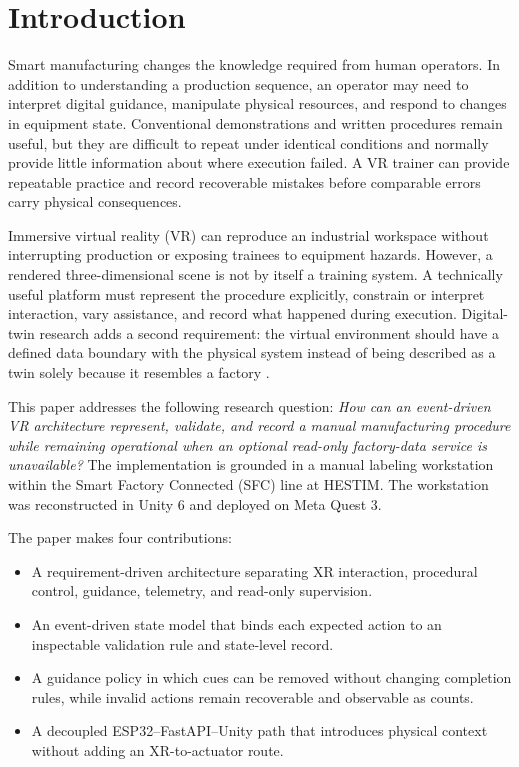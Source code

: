 \documentclass[conference]{IEEEtran}
\begin{document}
\section{Introduction}

Smart manufacturing changes the knowledge required from human operators. In addition to understanding a production sequence, an operator may need to interpret digital guidance, manipulate physical resources, and respond to changes in equipment state. Conventional demonstrations and written procedures remain useful, but they are difficult to repeat under identical conditions and normally provide little information about where execution failed. A VR trainer can provide repeatable practice and record recoverable mistakes before comparable errors carry physical consequences.

Immersive virtual reality (VR) can reproduce an industrial workspace without interrupting production or exposing trainees to equipment hazards. However, a rendered three-dimensional scene is not by itself a training system. A technically useful platform must represent the procedure explicitly, constrain or interpret interaction, vary assistance, and record what happened during execution. Digital-twin research adds a second requirement: the virtual environment should have a defined data boundary with the physical system instead of being described as a twin solely because it resembles a factory \cite{Jones2020,Rasheed2020}.

This paper addresses the following research question: \emph{How can an event-driven VR architecture represent, validate, and record a manual manufacturing procedure while remaining operational when an optional read-only factory-data service is unavailable?} The implementation is grounded in a manual labeling workstation within the Smart Factory Connected (SFC) line at HESTIM. The workstation was reconstructed in Unity 6 and deployed on Meta Quest 3.

The paper makes four contributions:
\begin{itemize}
    \item A requirement-driven architecture separating XR interaction, procedural control, guidance, telemetry, and read-only supervision.
    \item An event-driven state model that binds each expected action to an inspectable validation rule and state-level record.
    \item A guidance policy in which cues can be removed without changing completion rules, while invalid actions remain recoverable and observable as counts.
    \item A decoupled ESP32--FastAPI--Unity path that introduces physical context without adding an XR-to-actuator route.
\end{itemize}
\end{document}
